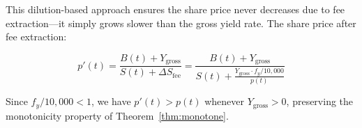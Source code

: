 This dilution-based approach ensures the share price never decreases due to fee extraction---it simply grows slower than the gross yield rate. The share price after fee extraction:

\begin{equation}
  p'(t) = \frac{B(t) + Y_{\text{gross}}}{S(t) + \Delta S_{\text{fee}}} = \frac{B(t) + Y_{\text{gross}}}{S(t) + \frac{Y_{\text{gross}} \cdot f_y / 10{,}000}{p(t)}}
\end{equation}

Since $f_y / 10{,}000 < 1$, we have $p'(t) > p(t)$ whenever $Y_{\text{gross}} > 0$, preserving the monotonicity property of Theorem~\ref{thm:monotone}.

